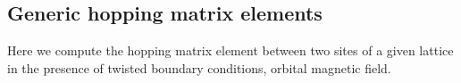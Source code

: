 %
\subsection{Generic hopping matrix elements}\label{sec:generic_hopping}


Here we compute the hopping matrix element  between two sites of a given lattice  in the presence of twisted boundary conditions,  orbital magnetic field.
